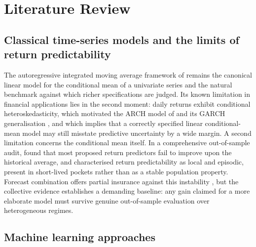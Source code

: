 
\section{Literature Review}
\label{sec:literature}

\subsection{Classical time-series models and the limits of return predictability}

The autoregressive integrated moving average framework of \citet{box1970time}
remains the canonical linear model for the conditional mean of a univariate
series and the natural benchmark against which richer specifications are judged.
Its known limitation in financial applications lies in the second moment: daily
returns exhibit conditional heteroskedasticity, which motivated the ARCH model of
\citet{engle1982autoregressive} and its GARCH generalisation
\citep{bollerslev1986generalized}, and which implies that a correctly specified
linear conditional-mean model may still misstate predictive uncertainty by a wide
margin. A second limitation concerns the conditional mean itself. In a
comprehensive out-of-sample audit, \citet{welch2008comprehensive} found that most
proposed return predictors fail to improve upon the historical average, and
\citet{timmermann2008elusive} characterised return predictability as local and
episodic, present in short-lived pockets rather than as a stable population
property. Forecast combination offers partial insurance against this instability
\citep{rapach2010out}, but the collective evidence establishes a demanding
baseline: any gain claimed for a more elaborate model must survive genuine
out-of-sample evaluation over heterogeneous regimes.

\subsection{Machine learning approaches}

